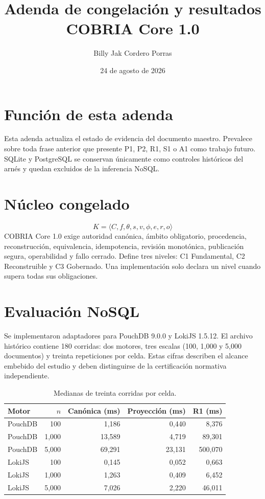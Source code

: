 \documentclass[11pt]{article}
\title{Adenda de congelación y resultados\\COBRIA Core 1.0}
\author{Billy Jak Cordero Porras}
\date{24 de agosto de 2026}
\begin{document}
\maketitle
\section*{Función de esta adenda}
Esta adenda actualiza el estado de evidencia del documento maestro. Prevalece sobre toda frase anterior que presente P1, P2, R1, S1 o A1 como trabajo futuro. SQLite y PostgreSQL se conservan únicamente como controles históricos del arnés y quedan excluidos de la inferencia NoSQL.

\section*{Núcleo congelado}
\[
K=\langle C,f,\theta,s,v,\phi,e,r,o\rangle
\]
COBRIA Core 1.0 exige autoridad canónica, ámbito obligatorio, procedencia, reconstrucción, equivalencia, idempotencia, revisión monotónica, publicación segura, operabilidad y fallo cerrado. Define tres niveles: C1 Fundamental, C2 Reconstruible y C3 Gobernado. Una implementación solo declara un nivel cuando supera todas sus obligaciones.

\section*{Evaluación NoSQL}
Se implementaron adaptadores para PouchDB 9.0.0 y LokiJS 1.5.12. El archivo histórico contiene 180 corridas: dos motores, tres escalas (100, 1,000 y 5,000 documentos) y treinta repeticiones por celda. Estas cifras describen el alcance embebido del estudio y deben distinguirse de la certificación normativa independiente.

\begin{table}[h]\centering\small
\begin{tabular}{lrrrr}
\toprule Motor & $n$ & Canónica (ms) & Proyección (ms) & R1 (ms)\\\midrule
PouchDB&100&1,186&0,440&8,376\\
PouchDB&1,000&13,589&4,719&89,301\\
PouchDB&5,000&69,291&23,131&500,070\\
LokiJS&100&0,145&0,052&0,663\\
LokiJS&1,000&1,263&0,409&6,452\\
LokiJS&5,000&7,026&2,220&46,011\\\bottomrule
\end{tabular}
\caption{Medianas de treinta corridas por celda.}
\end{table}
\end{document}
